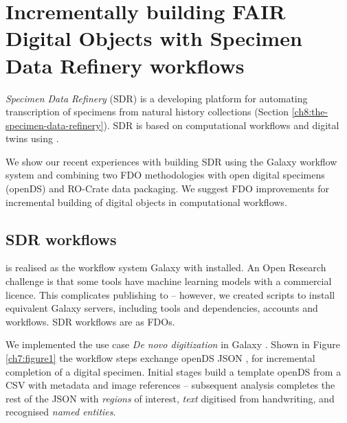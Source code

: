 \section[Incrementally building FAIR Digital Objects with the Specimen Data Refinery]{Incrementally building FAIR Digital Objects with Specimen Data Refinery workflows}
\label{ch7:incrementally-building-fair-digital-objects-with-specimen-data-refinery-workflows}

\emph{Specimen Data Refinery} (\acrshort{SDR}) is a developing platform for
automating transcription of specimens from natural history collections
\cite{Hardisty 2022} (Section \vref{ch8:the-specimen-data-refinery}). SDR is
based on computational workflows and digital twins using
.

We show our recent experiences with building SDR using the Galaxy
workflow system and combining two FDO methodologies with open digital
specimens (\acrshort{openDS}) and RO-Crate data packaging. We suggest FDO
improvements for incremental building of digital objects in
computational workflows.

\subsection{SDR workflows}\label{ch7:sdr-workflows}

 is realised as the workflow system
Galaxy \cite{Afgan 2018} with
 installed. An Open
Research challenge is that some tools have machine learning models with
a commercial licence. This complicates publishing to
 -- however, we
created  scripts to install
equivalent Galaxy servers, including tools and dependencies, accounts
and workflows. SDR workflows are
 as
FDOs.

We implemented the use case \emph{De novo digitization} in Galaxy \cite{Brack 2022b}.
Shown in Figure \vref{ch7:figure1} the
workflow steps exchange \acrshort{openDS} \acrshort{JSON} \cite{Hardisty 2019a}, for
incremental completion of a digital specimen. Initial stages build a
template openDS from a \acrshort{CSV} with metadata and image references --
subsequent analysis completes the rest of the JSON with \emph{regions}
of interest, \emph{text} digitised from handwriting, and recognised
\emph{named entities}.

